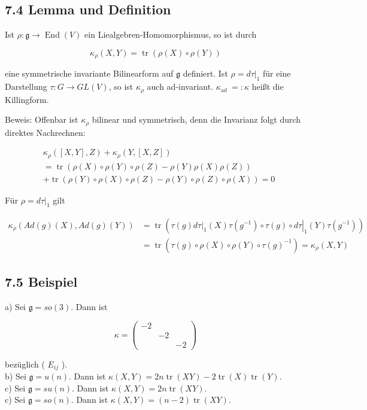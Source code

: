 \documentclass[10pt, letterpaper]{article}
\begin{document}
\subsection*{7.4 Lemma und Definition}
Ist $\rho: \mathfrak{g} \rightarrow \operatorname{End}(V)$ ein Liealgebren-Homomorphismus, so ist durch

$$
\kappa_{\rho}(X, Y)=\operatorname{tr}(\rho(X) \circ \rho(Y))
$$

eine symmetrische invariante Bilinearform auf $\mathfrak{g}$ definiert. Ist $\rho=\left.d \tau\right|_{1}$ für eine Darstellung $\tau: G \rightarrow G L(V)$, so ist $\kappa_{\rho}$ auch ad-invariant. $\kappa_{\text {ad }}=: \kappa$ heißt die Killingform.

Beweis: Offenbar ist $\kappa_{\rho}$ bilinear und symmetrisch, denn die Invarianz folgt durch direktes Nachrechnen:

$$
\begin{aligned}
& \kappa_{\rho}([X, Y], Z)+\kappa_{\rho}(Y,[X, Z]) \\
& =\operatorname{tr}(\rho(X) \circ \rho(Y) \circ \rho(Z)-\rho(Y) \rho(X) \rho(Z)) \\
& +\operatorname{tr}(\rho(Y) \circ \rho(X) \circ \rho(Z)-\rho(Y) \circ \rho(Z) \circ \rho(X))=0
\end{aligned}
$$

Für $\rho=\left.d \tau\right|_{1}$ gilt

$$
\begin{aligned}
\kappa_{\rho}(A d(g)(X), A d(g)(Y)) & =\operatorname{tr}\left(\left.\left.\tau(g) d \tau\right|_{1}(X) \tau\left(g^{-1}\right) \circ \tau(g) \circ d \tau\right|_{1}(Y) \tau\left(g^{-1}\right)\right) \\
& =\operatorname{tr}\left(\tau(g) \circ \rho(X) \circ \rho(Y) \circ \tau(g)^{-1}\right)=\kappa_{\rho}(X, Y)
\end{aligned}
$$

\subsection*{7.5 Beispiel}
a) Sei $\mathfrak{g}=s o(3)$. Dann ist

$$
\kappa=\left(\begin{array}{lll}
-2 & & \\
& -2 & \\
& & -2
\end{array}\right)
$$

bezüglich ( $E_{i j}$ ).\\
b) Sei $\mathfrak{g}=u(n)$. Dann ist $\kappa(X, Y)=2 n \operatorname{tr}(X Y)-2 \operatorname{tr}(X) \operatorname{tr}(Y)$.\\
c) Sei $\mathfrak{g}=s u(n)$. Dann ist $\kappa(X, Y)=2 n \operatorname{tr}(X Y)$.\\
c) Sei $\mathfrak{g}=s o(n)$. Dann ist $\kappa(X, Y)=(n-2) \operatorname{tr}(X Y)$.
\end{document}

